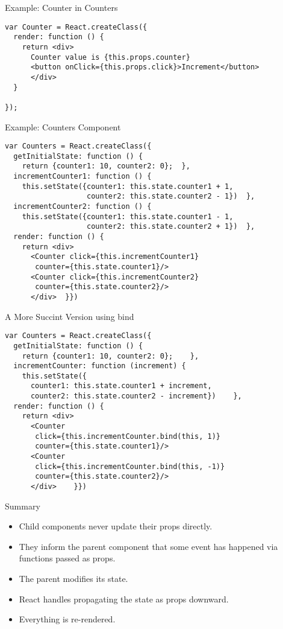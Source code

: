 \documentclass[presentation]{beamer}
\begin{document}
\begin{frame}[fragile,label=sec-5]{Example: Counter in Counters}
 \begin{verbatim}
var Counter = React.createClass({
  render: function () {
    return <div>
      Counter value is {this.props.counter}
      <button onClick={this.props.click}>Increment</button>
      </div>
  }

});
\end{verbatim}
\end{frame}

\begin{frame}[fragile,label=sec-6]{Example: Counters Component}
 \begin{verbatim}
var Counters = React.createClass({
  getInitialState: function () {
    return {counter1: 10, counter2: 0};  },
  incrementCounter1: function () {
    this.setState({counter1: this.state.counter1 + 1,
                   counter2: this.state.counter2 - 1})  },
  incrementCounter2: function () {
    this.setState({counter1: this.state.counter1 - 1,
                   counter2: this.state.counter2 + 1})  },
  render: function () {
    return <div>
      <Counter click={this.incrementCounter1}
       counter={this.state.counter1}/>
      <Counter click={this.incrementCounter2}
       counter={this.state.counter2}/>
      </div>  }})
\end{verbatim}
\end{frame}

\begin{frame}[fragile,label=sec-7]{A More Succint Version using bind}
 \begin{verbatim}
var Counters = React.createClass({
  getInitialState: function () {
    return {counter1: 10, counter2: 0};    },
  incrementCounter: function (increment) {
    this.setState({
      counter1: this.state.counter1 + increment,
      counter2: this.state.counter2 - increment})    },
  render: function () {
    return <div>
      <Counter
       click={this.incrementCounter.bind(this, 1)}
       counter={this.state.counter1}/>
      <Counter
       click={this.incrementCounter.bind(this, -1)}
       counter={this.state.counter2}/>
      </div>    }})
\end{verbatim}
\end{frame}


\begin{frame}[label=sec-8]{Summary}
\begin{itemize}
\item Child components never update their props directly.
\item They inform the parent component that some event has happened via functions
passed as props.
\item The parent modifies its state.
\item React handles propagating the state as props downward.
\item Everything is re-rendered.
\end{itemize}
\end{frame}
\end{document}
